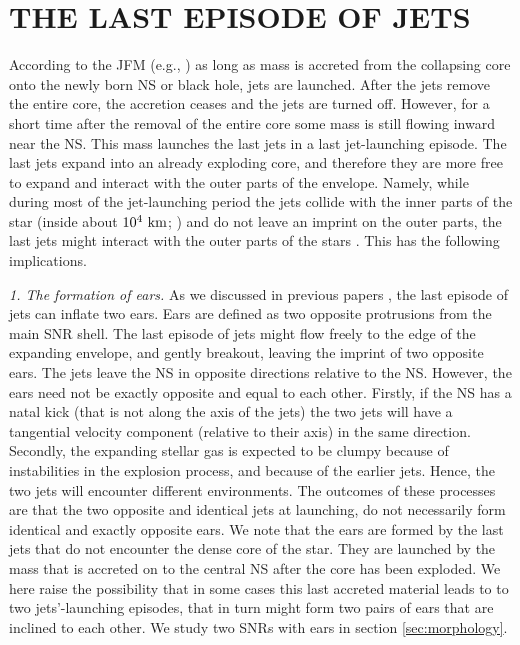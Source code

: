\documentclass[12pt,preprint,a4paper]{aastex}
\def \km{~\rm{km}}
\begin{document}
\section{THE LAST EPISODE OF JETS}
\label{sec:last}
 
 According to the JFM (e.g., \citealt{Gilkisetal2016}) as long as mass is accreted from the collapsing core onto the newly born NS or black hole, jets are launched. After the jets remove the entire core, the accretion ceases and the jets are turned off. However, for a short time after the removal of the entire core some mass is still flowing inward near the NS. This mass launches the last jets in a last jet-launching episode. The last jets expand into an already exploding core, and therefore they are more free to expand and interact with the outer parts of the envelope. Namely, while during most of the jet-launching period the jets collide with the inner parts of the star (inside about $10^4 \km$; \citealt{PapishSoker2011}) and do not leave an imprint on the outer parts, the last jets might interact with the outer parts of the stars \citep{Gilkisetal2016}. This has the following implications. 

\textit{1. The formation of ears.} As we discussed in previous papers \citep{GrichenerSoker2017, BearSoker2017, Soker2017c}, the last episode of jets can inflate two ears. Ears are defined as two opposite protrusions from the main SNR shell. The last episode of jets might flow freely to the edge of the expanding envelope, and gently breakout, leaving the imprint of two opposite ears.  The jets leave the NS in opposite directions relative to the NS. However, the ears need not be exactly opposite and equal to each other. Firstly, if the NS has a natal kick (that is not along the axis of the jets) the two jets will have a tangential velocity component (relative to their axis) in the same direction. Secondly, the expanding stellar gas is expected to be clumpy because of instabilities in the explosion process, and because of the earlier jets. Hence, the two jets will encounter different environments. The outcomes of these processes are that the two opposite and identical jets at launching, do not necessarily form identical and exactly opposite ears. 
We note that the ears are formed by the last jets that do not encounter the dense core of the star. They are launched by the mass that is accreted on to the central NS after the core has been exploded. We here raise the possibility that in some cases this last accreted material leads to to two jets'-launching episodes, that in turn might form two pairs of ears that are inclined to each other.
We study two SNRs with ears in section \ref{sec:morphology}. 
\end{document}
